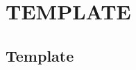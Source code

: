 \documentclass[12pt]{exam}
\newcommand{\qdate}{TEMPLATE} %
\begin{document}
\section*{\qdate}


\subsection*{Template}

\begin{questions}

\question 
    \ifprintanswers
        \begin{solution}
        \end{solution}
    \else
        \vfill
    \fi

    
\end{questions}
\end{document}
